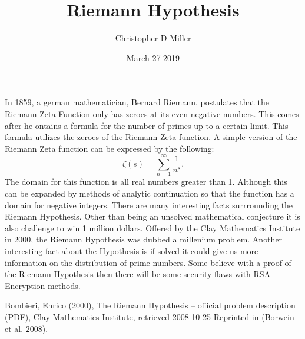 \documentclass[12pt]{article}
\title{Riemann Hypothesis}
\author{Christopher D Miller}
\date{March 27 2019}
\theoremstyle{plain}
\begin{document}
\maketitle

In 1859, a german mathematician, Bernard Riemann, postulates that the Riemann Zeta Function only has zeroes at its even negative numbers. This comes after he ontains a formula for the number of primes up to a certain limit. This formula utilizes the zeroes of the Riemann Zeta function. A simple version of the Riemann Zeta function can be expressed by the following:
$$ \zeta(s) = \sum_{n=1}^{\infty} \frac{1}{n^s}. $$
The domain for this function is all real numbers greater than 1. Although this can be expanded by methods of analytic continuation so that the function has a domain for negative integers. There are many interesting facts surrrounding the Riemann Hypothesis. Other than being an unsolved mathematical conjecture it is also challenge to win 1 million dollars. Offered by the Clay Mathematics Institute in 2000, the Riemann Hypothesis was dubbed a millenium problem. Another interesting fact about the Hypothesis is if solved it could give us more information on the distribution of prime numbers. Some believe with a proof of the Riemann Hypothesis then there will be some security flaws with RSA Encryption methods. 



\begin{thebibliography}{9}
    Bombieri, Enrico (2000), The Riemann Hypothesis – official problem description (PDF), Clay Mathematics Institute, retrieved 2008-10-25 Reprinted in (Borwein et al. 2008).
\end{thebibliography}
\end{document}
